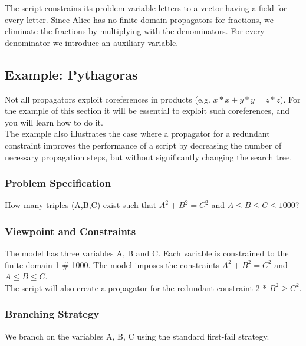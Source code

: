\documentclass[a4paper]{scrartcl}
\begin{document}
The script constrains its problem variable letters to a vector 
having a field for every letter. Since Alice has no finite domain 
propagators for fractions, we eliminate the fractions by multiplying 
with the denominators. For every denominator we introduce an auxiliary 
variable. 


\newpage
\subsection{Example: Pythagoras}
Not all propagators exploit coreferences in products 
(e.g. $ x * x + y * y = z * z $). For the example of 
this section it will be essential to exploit such 
coreferences, and you will learn how to do it.\\

The example also illustrates the case where a propagator 
for a redundant constraint improves the performance of a 
script by decreasing the number of necessary propagation 
steps, but without significantly changing the search tree. 

\subsubsection{Problem Specification}
How many triples (A,B,C) exist such that $ A^2 + B^2 = C^2 $ 
and $ A \le B \le C \le 1000 $? 

\subsubsection{Viewpoint and Constraints}
The model has three variables A, B and C. Each variable is 
constrained to the finite domain 1 $\#$ 1000. The model imposes 
the constraints  $ A^2 + B^2 = C^2 $ and $ A \le B \le C $.\\ 

The script will also create a propagator for the redundant 
constraint 2 * $B^2 \ge C^2$. 

\subsubsection{Branching Strategy}
We branch on the variables A, B, C  using the standard 
first-fail strategy.
\end{document}
